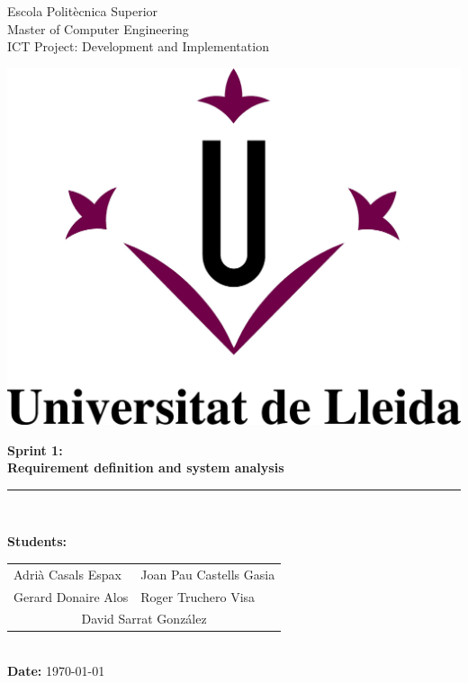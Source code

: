 \documentclass[11pt,a4paper]{article}
\begin{document}
\begin{titlepage}

\begin{flushleft}
Escola Politècnica Superior\\
\vspace*{0.15in}
Master of Computer Engineering\\
\vspace*{0.15in}
ICT Project: Development and Implementation
\end{flushleft}

\begin{center}
\vspace{2.0cm}\includegraphics[scale=0.3]{figures/M-UdL.jpg}
\vspace{5.0cm}

\begin{LARGE}
\textbf{Sprint 1:}\\ 
\vspace*{0.15in}
\textbf{Requirement definition and system analysis}
\end{LARGE}
\vspace{5.0cm}

\vspace*{0.25in}
\rule{80mm}{0.1mm}\\
\vspace*{0.1in}

\begin{large}
\textbf{Students:}

\begin{tabular}{ll}
Adrià Casals Espax  & Joan Pau Castells Gasia \\
Gerard Donaire Alos  & Roger Truchero Visa \\
\multicolumn{2}{c}{David Sarrat González}
\end{tabular}
\\
\textbf{Date:} \today
\end{large}

\end{center}
\end{titlepage}
\end{document}
